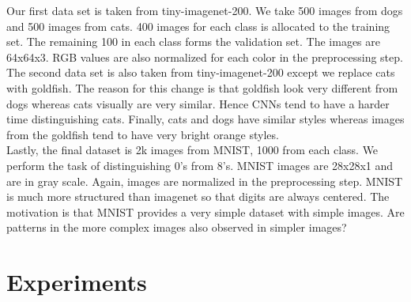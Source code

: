 \documentclass[10pt,twocolumn,letterpaper]{article}
\begin{document}
Our first data set is taken from tiny-imagenet-200. We take 500 images from dogs and 500 images from cats. 400 images for each class is allocated to the training set. The remaining 100 in each class forms the validation set. The images are 64x64x3. RGB values are also normalized for each color in the preprocessing step. \\

The second data set is also taken from tiny-imagenet-200 except we replace cats with goldfish. The reason for this change is that goldfish look very different from dogs whereas cats visually are very similar. Hence CNNs tend to have a harder time distinguishing cats. Finally, cats and dogs have similar styles whereas images from the goldfish tend to have very bright orange styles. \\

Lastly, the final dataset is 2k images from MNIST, 1000 from each class. We perform the task of distinguishing 0's from 8's. MNIST images are 28x28x1 and are in gray scale. Again, images are normalized in the preprocessing step. MNIST is much more structured than imagenet so that digits are always centered. The motivation is that MNIST provides a very simple dataset with simple images. Are patterns in the more complex images also observed in simpler images? 

\section{Experiments}


\end{document}
